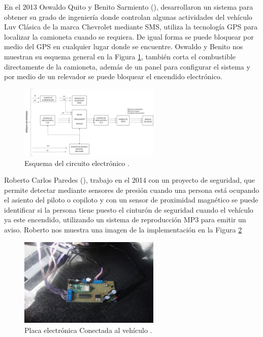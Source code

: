 En el 2013 Oswaldo Quito y Benito Sarmiento (\cite{UPS-12}), desarrollaron un sistema para obtener su grado de ingeniería donde controlan algunas actividades del vehículo Luv Clásica de la marca Chevrolet mediante SMS, utiliza la tecnología GPS para localizar la camioneta cuando se requiera. De igual forma se puede bloquear por medio del GPS en cualquier lugar donde se encuentre. Oswaldo y Benito nos muestran su esquema general en la Figura \ref{Fnueve}, también corta el combustible directamente de la camioneta, además de un panel para configurar el sistema y por medio de un relevador se puede bloquear el encendido electrónico.\\

%
\begin{figure}[H]
\centering
\includegraphics[width=0.6\textwidth]{introduccion/fig12.jpg}
\caption{Esquema del circuito electrónico \cite{UPS-12}. }
\label{Fnueve}
\end{figure}
%

Roberto Carlos Paredes (\cite{UPS-14}), trabajo en el 2014 con un proyecto de seguridad, que permite detectar mediante sensores de presión cuando una persona está ocupando el asiento del piloto o copiloto y con un sensor de proximidad magnético se puede identificar si la persona tiene puesto el cinturón de seguridad cuando el vehículo ya este encendido, utilizando un sistema de reproducción MP3 para emitir un aviso. Roberto nos muestra una imagen de la implementación en la Figura \ref{Fdiez}\\

%
\begin{figure}[H]
\centering
\includegraphics[width=0.6\textwidth]{introduccion/fig13.jpg}
\caption{Placa electrónica Conectada al vehículo \cite{UPS-14}. }
\label{Fdiez}
\end{figure}
%

